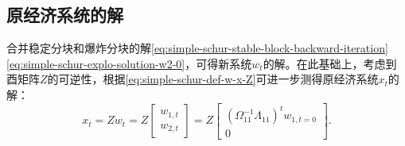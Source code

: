 \subsection{原经济系统的解}
合并稳定分块和爆炸分块的解\eqref{eq:simple-schur-stable-block-backward-iteration}\eqref{eq:simple-schur-explo-solution-w2-0}，可得新系统$w_t$的解。在此基础上，考虑到酉矩阵$Z$的可逆性，根据\eqref{eq:simple-schur-def-w-x-Z}可进一步测得原经济系统$x_t$的解：
\begin{equation}
  \label{simple-schur-system-xt-solution}
  x_t = Z w_t = Z \begin{bmatrix} w_{1,t} \\ w_{2,t} \end{bmatrix} = Z \begin{bmatrix}
  \left( \Omega_{11}^{-1} \Lambda_{11}\right)^t w_{1,t=0} \\
  0
  \end{bmatrix}.
\end{equation}
